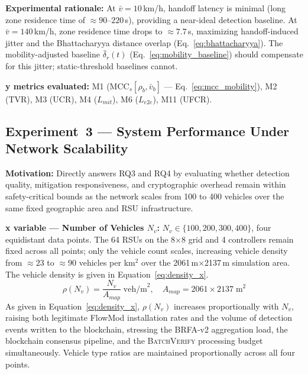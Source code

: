\documentclass[12pt, a4paper]{report}
\begin{document}
{{\textbf{Experimental rationale:} At $\bar{v} = 10$\,km/h,
handoff latency is minimal (long zone residence time
of $\approx 90$--$220$\,s), providing a near-ideal
detection baseline. At $\bar{v} = 140$\,km/h,
zone residence time drops to $\approx 7.7$\,s,
maximizing handoff-induced jitter and the
Bhattacharyya distance overlap
(Eq.~\ref{eq:bhattacharyya}). The mobility-adjusted
baseline $\bar{\delta}_r(t)$ (Eq.~\ref{eq:mobility_baseline})
should compensate for this jitter; static-threshold
baselines cannot.

\textbf{y metrics evaluated:}
M1 ($\text{MCC}_s[\rho_b, \bar{v}_b]$ —
Eq.~\ref{eq:mcc_mobility}), M2 (TVR), M3 (UCR),
M4 ($L_{mit}$), M6 ($L_{e2e}$), M11 (UFCR).



\subsection{Experiment~3 — System Performance Under
Network Scalability}
\label{sec:exp3}

\textbf{Motivation:} Directly answers RQ3 and RQ4
by evaluating whether detection quality, mitigation
responsiveness, and cryptographic overhead remain
within safety-critical bounds as the network scales
from 100 to 400 vehicles over the same fixed
geographic area and \ac{RSU} infrastructure.

\textbf{x variable — Number of Vehicles $N_v$:}
$N_v \in \{100, 200, 300, 400\}$, four equidistant
data points. The 64 \ac{RSU}s on the 8$\times$8
grid and 4 controllers remain fixed across all
points; only the vehicle count scales, increasing
vehicle density from $\approx 23$ to $\approx 90$
vehicles per km$^2$ over the
2061\,m$\times$2137\,m simulation area.
The vehicle density is given in
Equation~\eqref{eq:density_x}.
\begin{equation}
\rho(N_v) =
\frac{N_v}{A_{map}}
\;\text{veh/m}^2,
\quad A_{map} = 2061 \times 2137\;\text{m}^2
\label{eq:density_x}
\end{equation}
As given in Equation~\eqref{eq:density_x},
$\rho(N_v)$ increases proportionally with $N_v$,
raising both legitimate FlowMod installation rates
and the volume of detection events written to the
blockchain, stressing the BRFA-v2 aggregation load,
the blockchain consensus pipeline, and the
\textsc{BatchVerify} processing budget simultaneously.
Vehicle type ratios are maintained proportionally
across all four points.

}}
\end{document}
